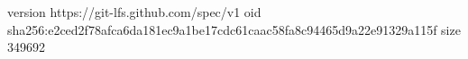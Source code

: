 version https://git-lfs.github.com/spec/v1
oid sha256:e2ced2f78afca6da181ec9a1be17cdc61caac58fa8c94465d9a22e91329a115f
size 349692
